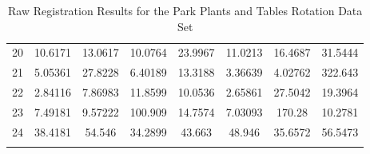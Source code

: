 \begin{center}
\begin{longtable}{cccccccc}
20 & 10.6171 & 13.0617 & 10.0764 & 23.9967 & 11.0213 & 16.4687 & 31.5444\\
21 & 5.05361 & 27.8228 & 6.40189 & 13.3188 & 3.36639 & 4.02762 & 322.643\\
22 & 2.84116 & 7.86983 & 11.8599 & 10.0536 & 2.65861 & 27.5042 & 19.3964\\
23 & 7.49181 & 9.57222 & 100.909 & 14.7574 & 7.03093 & 170.28 & 10.2781\\
24 & 38.4181 & 54.546 & 34.2899 & 43.663 & 48.946 & 35.6572 & 56.5473\\
\caption{Raw Registration Results for the Park Plants and Tables Rotation Data Set}
\label{tab:parkplantsandtablesFULL}
\end{longtable}
\end{center}




